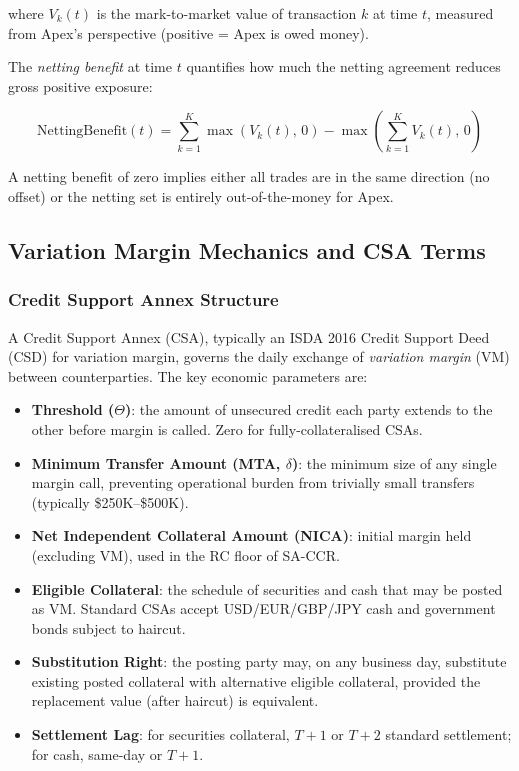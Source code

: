 \documentclass[11pt,a4paper]{article}
\begin{document}
where $V_k(t)$ is the mark-to-market value of transaction $k$ at time $t$,
measured from Apex's perspective (positive = Apex is owed money).

The \emph{netting benefit} at time $t$ quantifies how much the netting agreement
reduces gross positive exposure:

\begin{equation}
  \text{NettingBenefit}(t)
    = \sum_{k=1}^{K} \max(V_k(t),\, 0)
    - \max\!\left(\sum_{k=1}^{K} V_k(t),\, 0\right)
  \label{eq:netting_benefit}
\end{equation}

A netting benefit of zero implies either all trades are in the same direction
(no offset) or the netting set is entirely out-of-the-money for Apex.

\subsection{Variation Margin Mechanics and CSA Terms}
\label{sec:vm_mechanics}

\subsubsection{Credit Support Annex Structure}

A Credit Support Annex (CSA), typically an ISDA 2016 Credit Support Deed
(CSD) for variation margin, governs the daily exchange of \emph{variation
margin} (VM) between counterparties. The key economic parameters are:

\begin{itemize}[noitemsep]
  \item \textbf{Threshold ($\Theta$)}: the amount of unsecured credit each
        party extends to the other before margin is called. Zero for
        fully-collateralised CSAs.
  \item \textbf{Minimum Transfer Amount (MTA, $\delta$)}: the minimum size of
        any single margin call, preventing operational burden from trivially
        small transfers (typically \$250K--\$500K).
  \item \textbf{Net Independent Collateral Amount (NICA)}: initial margin held
        (excluding VM), used in the RC floor of SA-CCR.
  \item \textbf{Eligible Collateral}: the schedule of securities and cash that
        may be posted as VM. Standard CSAs accept USD/EUR/GBP/JPY cash and
        government bonds subject to haircut.
  \item \textbf{Substitution Right}: the posting party may, on any business
        day, substitute existing posted collateral with alternative eligible
        collateral, provided the replacement value (after haircut) is
        equivalent.
  \item \textbf{Settlement Lag}: for securities collateral, $T+1$ or $T+2$
        standard settlement; for cash, same-day or $T+1$.
\end{itemize}
\end{document}

